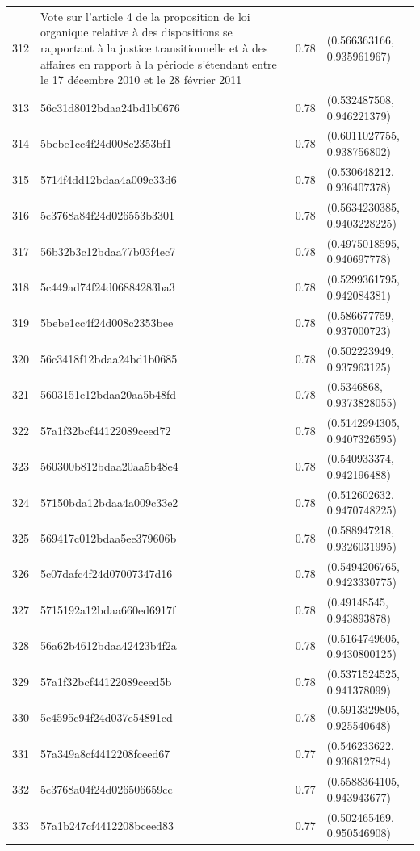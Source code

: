 \begin{table}[ht]
\begin{tabular}{rlrl}
  312 & Vote sur l'article 4 de la proposition de loi organique relative à des dispositions se rapportant à la justice transitionnelle et à des affaires en rapport à la période s'étendant entre le 17 décembre 2010 et le 28 février 2011 & 0.78 & (0.566363166, 0.935961967) \\ 
  313 & 56c31d8012bdaa24bd1b0676 & 0.78 & (0.532487508, 0.946221379) \\ 
  314 & 5bebe1cc4f24d008c2353bf1 & 0.78 & (0.6011027755, 0.938756802) \\ 
  315 & 5714f4dd12bdaa4a009c33d6 & 0.78 & (0.530648212, 0.936407378) \\ 
  316 & 5c3768a84f24d026553b3301 & 0.78 & (0.5634230385, 0.9403228225) \\ 
  317 & 56b32b3c12bdaa77b03f4ec7 & 0.78 & (0.4975018595, 0.940697778) \\ 
  318 & 5c449ad74f24d06884283ba3 & 0.78 & (0.5299361795, 0.942084381) \\ 
  319 & 5bebe1cc4f24d008c2353bee & 0.78 & (0.586677759, 0.937000723) \\ 
  320 & 56c3418f12bdaa24bd1b0685 & 0.78 & (0.502223949, 0.937963125) \\ 
  321 & 5603151e12bdaa20aa5b48fd & 0.78 & (0.5346868, 0.9373828055) \\ 
  322 & 57a1f32bcf44122089ceed72 & 0.78 & (0.5142994305, 0.9407326595) \\ 
  323 & 560300b812bdaa20aa5b48e4 & 0.78 & (0.540933374, 0.942196488) \\ 
  324 & 57150bda12bdaa4a009c33e2 & 0.78 & (0.512602632, 0.9470748225) \\ 
  325 & 569417c012bdaa5ee379606b & 0.78 & (0.588947218, 0.9326031995) \\ 
  326 & 5c07dafc4f24d07007347d16 & 0.78 & (0.5494206765, 0.9423330775) \\ 
  327 & 5715192a12bdaa660ed6917f & 0.78 & (0.49148545, 0.943893878) \\ 
  328 & 56a62b4612bdaa42423b4f2a & 0.78 & (0.5164749605, 0.9430800125) \\ 
  329 & 57a1f32bcf44122089ceed5b & 0.78 & (0.5371524525, 0.941378099) \\ 
  330 & 5c4595c94f24d037e54891cd & 0.78 & (0.5913329805, 0.925540648) \\ 
  331 & 57a349a8cf4412208fceed67 & 0.77 & (0.546233622, 0.936812784) \\ 
  332 & 5c3768a04f24d026506659cc & 0.77 & (0.5588364105, 0.943943677) \\ 
  333 & 57a1b247cf4412208bceed83 & 0.77 & (0.502465469, 0.950546908) \\ 

\end{tabular}
\end{table}
